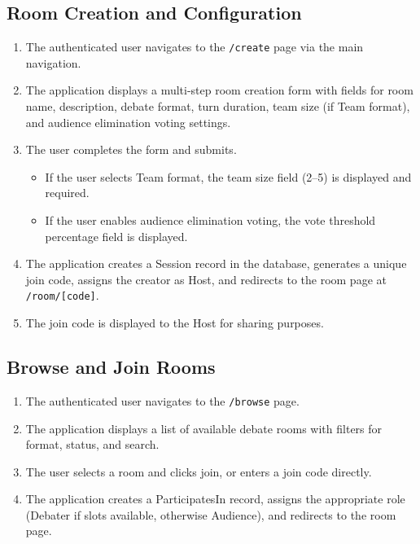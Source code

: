 \documentclass[12pt]{article}
\begin{document}
\subsection{Room Creation and Configuration}

\begin{enumerate}
    \item The authenticated user navigates to the \texttt{/create} page via the main navigation.
    \item The application displays a multi-step room creation form with fields for room name, description, debate format, turn duration, team size (if Team format), and audience elimination voting settings.
    \item The user completes the form and submits.
    \begin{itemize}
        \item If the user selects Team format, the team size field (2--5) is displayed and required.
        \item If the user enables audience elimination voting, the vote threshold percentage field is displayed.
    \end{itemize}
    \item The application creates a Session record in the database, generates a unique join code, assigns the creator as Host, and redirects to the room page at \texttt{/room/[code]}.
    \item The join code is displayed to the Host for sharing purposes.
\end{enumerate}

\subsection{Browse and Join Rooms}

\begin{enumerate}
    \item The authenticated user navigates to the \texttt{/browse} page.
    \item The application displays a list of available debate rooms with filters for format, status, and search.
    \item The user selects a room and clicks join, or enters a join code directly.
    \item The application creates a ParticipatesIn record, assigns the appropriate role (Debater if slots available, otherwise Audience), and redirects to the room page.
\end{enumerate}
\end{document}
